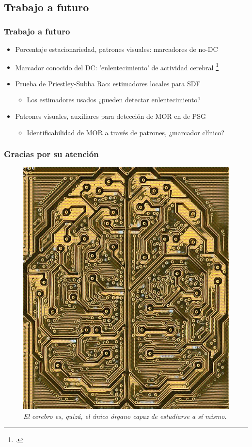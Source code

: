 \documentclass{beamer}
\begin{document}

\subsection{Trabajo a futuro}

\begin{frame}\frametitle{Trabajo a futuro}
\begin{itemize}
\item Porcentaje estacionariedad, patrones visuales: marcadores de no-DC

\item Marcador conocido del DC: 'enlentecimiento' de actividad cerebral \footcite{Becerra12} 

\item Prueba de Priestley-Subba Rao: estimadores locales para SDF
\begin{itemize}
\item  Los estimadores usados ¿pueden detectar enlentecimiento?
\end{itemize}

\item Patrones visuales, auxiliares para detecci\'on de MOR en de PSG
\begin{itemize}
\item Identificabilidad de MOR a trav\'es de patrones, ¿marcador cl\'inico?
\end{itemize}
\end{itemize}
\end{frame}


\begin{frame}\frametitle{Gracias por su atenci\'on}
\begin{figure}
\centering
\includegraphics[width=0.4\linewidth]{./img_adornos/cerebot.jpg}\\
\vspace*{1em}
\textit{El cerebro es, quiz\'a, el \'unico \'organo capaz de estudiarse a s\'i mismo.}
\end{figure}
\end{frame}

\end{document}
